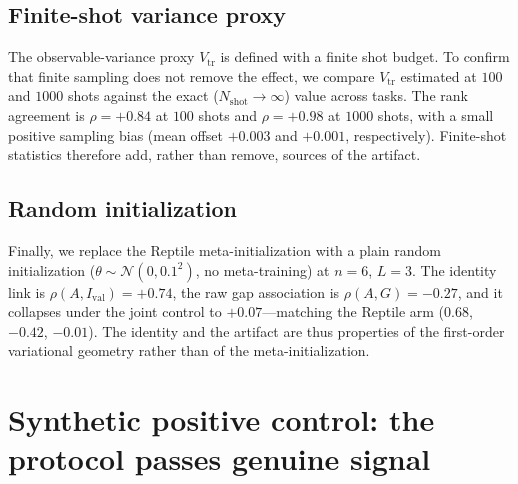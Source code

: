 \documentclass[aps,pra,onecolumn,superscriptaddress,10pt]{revtex4-2}
\newcommand{\Ival}{I_{\mathrm{val}}}
\newcommand{\Vtr}{V_{\mathrm{tr}}}
\begin{document}
\subsection{Finite-shot variance proxy}

The observable-variance proxy $\Vtr$ is defined with a finite shot budget. To confirm that finite
sampling does not remove the effect, we compare $\Vtr$ estimated at $100$ and $1000$ shots against
the exact ($N_{\mathrm{shot}}\!\to\!\infty$) value across tasks. The rank agreement is $\rho=+0.84$
at $100$ shots and $\rho=+0.98$ at $1000$ shots, with a small positive sampling bias (mean offset
$+0.003$ and $+0.001$, respectively). Finite-shot statistics therefore add, rather than remove,
sources of the artifact.

\subsection{Random initialization}

Finally, we replace the Reptile meta-initialization with a plain random initialization
($\theta\sim\mathcal{N}(0,0.1^2)$, no meta-training) at $n=6$, $L=3$. The identity link is
$\rho(A,\Ival)=+0.74$, the raw gap association is $\rho(A,G)=-0.27$, and it collapses under the joint
control to $+0.07$---matching the Reptile arm ($0.68$, $-0.42$, $-0.01$). The identity and the
artifact are thus properties of the first-order variational geometry rather than of the
meta-initialization.

\section{Synthetic positive control: the protocol passes genuine signal}
\label{sm:positive}
\end{document}
